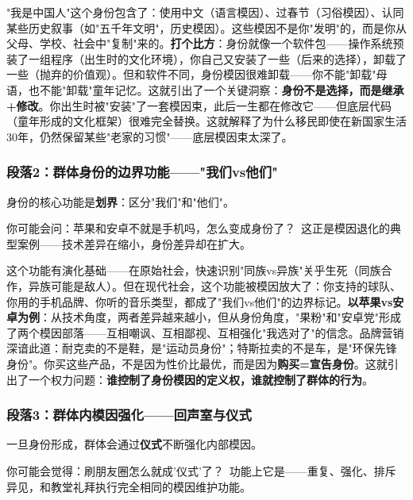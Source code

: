 \documentclass[../main.tex]{subfiles}
\begin{document}
"我是中国人"这个身份包含了：使用中文（语言模因）、过春节（习俗模因）、认同某些历史叙事（如"五千年文明"，历史模因）。这些模因不是你"发明"的，而是你从父母、学校、社会中"复制"来的。\textbf{打个比方}：身份就像一个软件包——操作系统预装了一组程序（出生时的文化环境），你自己又安装了一些（后来的选择），卸载了一些（抛弃的价值观）。但和软件不同，身份模因很难卸载——你不能"卸载"母语，也不能"卸载"童年记忆。这就引出了一个关键洞察：\textbf{身份不是选择，而是继承+修改}。你出生时被"安装"了一套模因束，此后一生都在修改它——但底层代码（童年形成的文化框架）很难完全替换。这就解释了为什么移民即使在新国家生活30年，仍然保留某些"老家的习惯"——底层模因束太深了。

	\subsubsection*{段落2：群体身份的边界功能——"我们vs他们"}

	身份的核心功能是\textbf{划界}：区分"我们"和"他们"。

	\begin{tcolorbox}[colback=yellow!5, title=\textit{读者行为预测}]

		你可能会问：苹果和安卓不就是手机吗，怎么变成身份了？\ 这正是模因退化的典型案例——技术差异在缩小，身份差异却在扩大。

	\end{tcolorbox}

这个功能有演化基础——在原始社会，快速识别"同族vs异族"关乎生死（同族合作，异族可能是敌人）。但在现代社会，这个功能被模因放大了：你支持的球队、你用的手机品牌、你听的音乐类型，都成了"我们vs他们"的边界标记。\textbf{以苹果vs安卓为例}：从技术角度，两者差异越来越小，但从身份角度，"果粉"和"安卓党"形成了两个模因部落——互相嘲讽、互相鄙视、互相强化"我选对了"的信念。品牌营销深谙此道：耐克卖的不是鞋，是"运动员身份"；特斯拉卖的不是车，是"环保先锋身份"。你买这些产品，不是因为性价比最优，而是因为\textbf{购买=宣告身份}。这就引出了一个权力问题：\textbf{谁控制了身份模因的定义权，谁就控制了群体的行为}。

	\subsubsection*{段落3：群体内模因强化——回声室与仪式}

	一旦身份形成，群体会通过\textbf{仪式}不断强化内部模因。

	\begin{tcolorbox}[colback=yellow!5, title=\textit{读者行为预测}]

		你可能会觉得：刷朋友圈怎么就成'仪式'了？\ 功能上它是——重复、强化、排斥异见，和教堂礼拜执行完全相同的模因维护功能。

	\end{tcolorbox}
\end{document}

